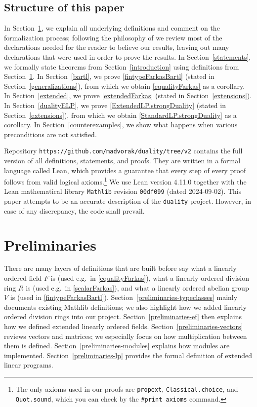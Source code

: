 \documentclass[]{article}
\renewcommand{\.}{\hskip .75pt}
\newcommand{\sekt}[1]{Section~\ref{#1}}
\begin{document}
\subsection{Structure of this paper}

In \sekt{preliminaries}, we explain all underlying definitions and
comment on the formalization process;
following the philosophy of \cite{Believe}
we review most of the declarations needed for the reader to believe
our results, leaving out many declarations that were used in order
to prove the results.
In \sekt{statements}, we formally state theorems from \sekt{introduction}
using definitions from \sekt{preliminaries}.
In \sekt{bartl}, we prove \ref{fintypeFarkasBartl} (stated in \sekt{generalizations}),
from which we obtain \ref{equalityFarkas} as a corollary.
In \sekt{extended}, we prove \ref{extendedFarkas} (stated in \sekt{extensions}).
In \sekt{dualityELP}, we prove \ref{ExtendedLP.strongDuality}
(stated in \sekt{extensions}), from which we obtain
\ref{StandardLP.strongDuality} as a corollary.
In \sekt{counterexamples}, we show what happens when various preconditions
are not satisfied.

Repository \texttt{https://github.com/madvorak/duality/tree/v2}
contains the full version of all definitions, statements,
and proofs. They are written in a formal language called
Lean, which provides a guarantee that every step of
every proof follows from valid logical axioms.\footnote{
The only axioms used in our proofs are
\texttt{propext}, \texttt{Classical.choice}, and
\texttt{Quot.sound}, which you can check by the
\texttt{\#print axioms} command.}
We use Lean version 4.11.0 together with the Lean
mathematical library \texttt{Mathlib} \cite{Mathlib}
revision \texttt{00df099} (dated 2024-09-02).
This paper attempts to be an accurate description of
the \texttt{duality} project.
However, in case of any discrepancy, the code shall prevail.

\section{Preliminaries}
\label{preliminaries}

There are many layers of definitions that are built before say
what a linearly ordered field $F$ is (used e.g.~in \ref{equalityFarkas}),
what a linearly ordered division ring $R$ is (used e.g.~in \ref{scalarFarkas}), and
what a linearly ordered abelian group $V$ is (used in \ref{fintypeFarkasBartl}).
\sekt{preliminaries-typeclasses} mainly documents existing Mathlib definitions;
we also highlight how we added linearly ordered division rings into our project.
\sekt{preliminaries-ef} then explains how we defined extended linearly ordered fields.
\sekt{preliminaries-vectors} reviews vectors and matrices; we especially focus on
how multiplication between them is defined.
\sekt{preliminaries-modules} explains how modules are implemented.
\sekt{preliminaries-lp} provides the formal definition of extended linear programs.
\end{document}
